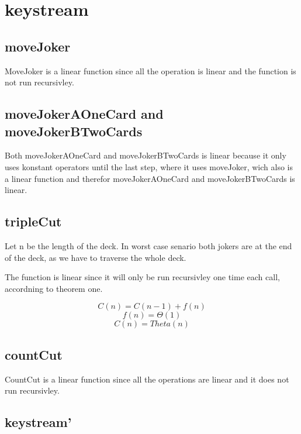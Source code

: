 \documentclass[12pt, a4paper]{article}
\begin{document}
\section{keystream}

\subsection{moveJoker}
MoveJoker is a linear function since all the operation is linear and the function is not run recursivley.

\subsection{moveJokerAOneCard and moveJokerBTwoCards}
Both moveJokerAOneCard and moveJokerBTwoCards is linear because it only uses konstant operators until the last step, where it uses moveJoker, wich also is a linear function and therefor moveJokerAOneCard and moveJokerBTwoCards is linear.

\subsection{tripleCut}
Let n be the length of the deck. In worst case senario both jokers are at the end of the deck, as we have to traverse the whole deck.

The function is linear since it will only be run recursivley one time each call, accordning to theorem one.

$$C(n) = C(n-1) + f(n)$$
$$f(n) = \Theta(1)$$
$$ C(n) = Theta(n)$$

\subsection{countCut}
CountCut is a linear function since all the operations are linear and it does not run recursivley.

\subsection{keystream'}
\end{document}
